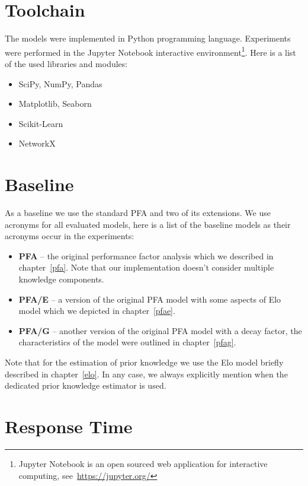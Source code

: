 \section{Toolchain}

The models were implemented in Python programming language. Experiments were performed in the Jupyter Notebook interactive environment\footnote{Jupyter Notebook is an open sourced web application for interactive computing, see~\url{https://jupyter.org/}}. Here is a list of the used libraries and modules:

\begin{itemize}
  \item SciPy, NumPy, Pandas
  \item Matplotlib, Seaborn
  \item Scikit-Learn
  \item NetworkX
\end{itemize}

\section{Baseline}

As a baseline we use the standard PFA and two of its extensions. We use acronyms for all evaluated models, here is a list of the baseline models as their acronyms occur in the experiments:

\begin{itemize}
  \item \textbf{PFA} -- the original performance factor analysis which we described in chapter~\ref{pfa}. Note that our implementation doesn't consider multiple knowledge components.
  \item \textbf{PFA/E} -- a version of the original PFA model with some aspects of Elo model which we depicted in chapter~\ref{pfae}.
  \item \textbf{PFA/G} -- another version of the original PFA model with a decay factor, the characteristics of the model were outlined in chapter~\ref{pfag}.
\end{itemize}

Note that for the estimation of prior knowledge we use the Elo model briefly described in chapter~\ref{elo}. In any case, we always explicitly mention when the dedicated prior knowledge estimator is used.

\section{Response Time}

